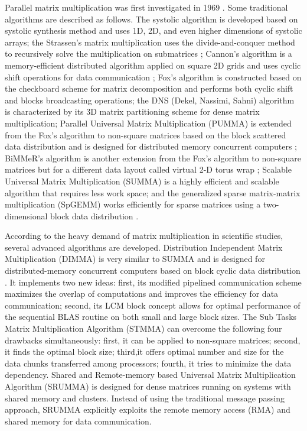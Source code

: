 \documentclass[conference]{IEEEtran}
\begin{document}
Parallel matrix multiplication was first investigated in 1969 \cite{b3}. Some traditional algorithms are described as follows. The systolic algorithm is developed based on systolic synthesis method and uses 1D, 2D, and even higher dimensions of systolic arrays\cite{b6,b7,b8}; the Strassen's matrix multiplication uses the divide-and-conquer method to recursively solve the multiplication on submatrices \cite{b9}; Cannon's  algorithm is a  memory-efficient distributed algorithm applied on square 2D grids and uses cyclic shift operations for data communication \cite{b4}; Fox's algorithm is constructed based on the checkboard scheme for matrix decomposition and performs both cyclic shift and blocks broadcasting operations\cite{b10}; the DNS (Dekel, Nassimi, Sahni) algorithm \cite{b11} is characterized by its 3D matrix partitioning scheme for dense matrix multiplication; Parallel Universal Matrix Multiplication (PUMMA) is extended from the Fox's algorithm to non-square matrices based on the block scattered data distribution and is designed for distributed memory concurrent computers \cite{b12, b13} ; BiMMeR's algorithm is another extension from the Fox's algorithm to non-square matrices but for a different data layout called virtual 2-D torus wrap \cite{b14}; Scalable Universal Matrix Multiplication (SUMMA) is a highly efficient and scalable algorithm that requires less work space\cite{b15}; and the generalized sparse matrix-matrix multiplication (SpGEMM) works efficiently for sparse matrices using a two-dimensional block data distribution \cite{b16}.

According to the heavy demand of matrix multiplication in scientific studies, several advanced algorithms are developed. Distribution Independent Matrix Multiplication (DIMMA) is very similar to SUMMA and is designed for distributed-memory concurrent computers based on block cyclic data distribution \cite{b17}. It implements two new ideas: first, its modified pipelined communication scheme maximizes the overlap of computations and improves the efficiency for data communication; second, its LCM block concept allows for optimal performance of the sequential BLAS routine on both small and large block sizes\cite{b17}. The Sub Tasks Matrix Multiplication Algorithm (STMMA) \cite{b3} can overcome the following four drawbacks simultaneously: first, it can be applied to non-square matrices; second, it finds the optimal block size; third,it offers optimal number and size for the data chunks transferred among processors; fourth, it tries to minimize the data dependency. Shared and Remote-memory based Universal Matrix Multiplication Algorithm (SRUMMA) is designed for dense matrices running on systems with shared memory and clusters\cite{b18}. Instead of using the traditional message passing approach, SRUMMA explicitly exploits the remote memory access (RMA) and shared memory for data communication.
\end{document}
